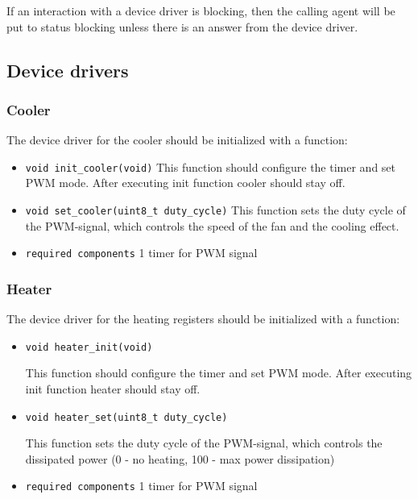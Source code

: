 \documentclass{scrreprt}
\begin{document}
\noindent
If an interaction with a device driver is blocking, then the calling agent will be put to status blocking unless there is an answer from
the device driver.

\subsection{Device drivers}

\subsubsection{Cooler}
The device driver for the cooler should be initialized with a function:

\begin{itemize}
		
\item\texttt{void init_cooler(void)}
This function should configure the timer and set PWM mode.
After executing init function cooler should stay off.

\item\texttt{void set_cooler(uint8_t duty_cycle)}
This function sets the duty cycle of the PWM-signal, which controls the speed of the fan and the cooling effect.

\item\texttt{required components}
	1 timer for PWM signal
\end{itemize}

\subsubsection{Heater}
The device driver for the heating registers should be initialized with a function:

\begin{itemize}
		
\item\texttt{void heater_init(void)}

This function should configure the timer and set PWM mode.
After executing init function heater should stay off.

\item\texttt{void heater_set(uint8_t duty_cycle)}

This function sets the duty cycle of the PWM-signal, which controls the dissipated power (0 - no heating, 100 - max power dissipation)

\item\texttt{required components}
	1 timer for PWM signal
\end{itemize}
\end{document}

